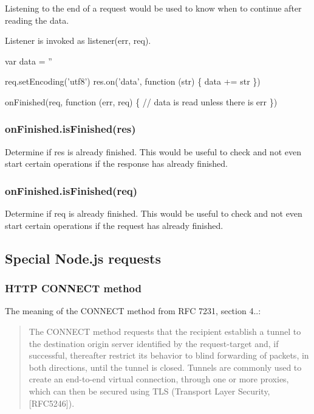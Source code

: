 Listening to the end of a request would be used to know when to continue after reading the data.

Listener is invoked as {\ttfamily listener(err, req)}.


\begin{DoxyCode}
var data = ''

req.setEncoding('utf8')
res.on('data', function (str) \{
  data += str
\})

onFinished(req, function (err, req) \{
  // data is read unless there is err
\})
\end{DoxyCode}


\subsubsection*{on\+Finished.\+is\+Finished(res)}

Determine if {\ttfamily res} is already finished. This would be useful to check and not even start certain operations if the response has already finished.

\subsubsection*{on\+Finished.\+is\+Finished(req)}

Determine if {\ttfamily req} is already finished. This would be useful to check and not even start certain operations if the request has already finished.

\subsection*{Special Node.\+js requests}

\subsubsection*{H\+T\+TP C\+O\+N\+N\+E\+CT method}

The meaning of the {\ttfamily C\+O\+N\+N\+E\+CT} method from R\+FC 7231, section 4..\+:

\begin{quote}
The C\+O\+N\+N\+E\+CT method requests that the recipient establish a tunnel to the destination origin server identified by the request-\/target and, if successful, thereafter restrict its behavior to blind forwarding of packets, in both directions, until the tunnel is closed. Tunnels are commonly used to create an end-\/to-\/end virtual connection, through one or more proxies, which can then be secured using T\+LS (Transport Layer Security, \mbox{[}R\+F\+C5246\mbox{]}). \end{quote}


